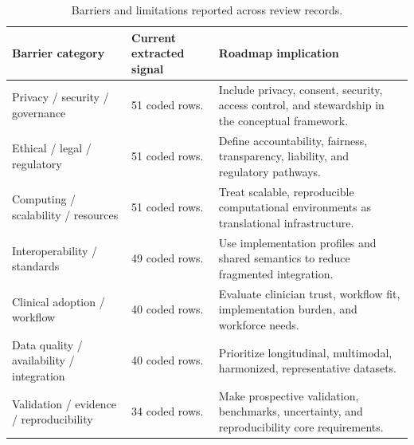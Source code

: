 \begin{table}[htbp]
\centering
\small
\caption{Barriers and limitations reported across review records.}
\label{tab:barriers}
\begin{tabularx}{\textwidth}{@{}>{\raggedright\arraybackslash}p{}YY@{}}
\toprule
\textbf{Barrier category} & \textbf{Current extracted signal} & \textbf{Roadmap implication} \\
\midrule
Privacy / security / governance & 51 coded rows. & Include privacy, consent, security, access control, and stewardship in the conceptual framework. \\
Ethical / legal / regulatory & 51 coded rows. & Define accountability, fairness, transparency, liability, and regulatory pathways. \\
Computing / scalability / resources & 51 coded rows. & Treat scalable, reproducible computational environments as translational infrastructure. \\
Interoperability / standards & 49 coded rows. & Use implementation profiles and shared semantics to reduce fragmented integration. \\
Clinical adoption / workflow & 40 coded rows. & Evaluate clinician trust, workflow fit, implementation burden, and workforce needs. \\
Data quality / availability / integration & 40 coded rows. & Prioritize longitudinal, multimodal, harmonized, representative datasets. \\
Validation / evidence / reproducibility & 34 coded rows. & Make prospective validation, benchmarks, uncertainty, and reproducibility core requirements. \\
\bottomrule
\end{tabularx}
\end{table}
